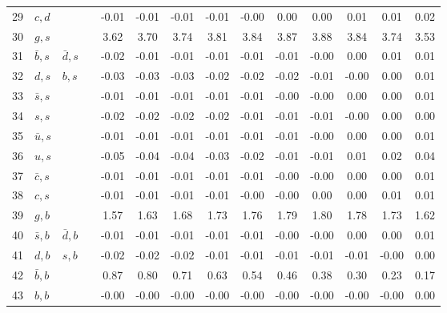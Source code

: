 \begin{tabularx}{\textwidth}{rXXX@{}S@{}S@{}S@{}S@{}S@{}S@{}S@{}S@{}S@{}S}
 29 & $c, d$           &                   &                  & -0.01 & -0.01 & -0.01 & -0.01 & -0.00 &  0.00 &  0.00 &  0.01 &  0.01 &  0.02 \\
 30 & $g, s$           &                   &                  &  3.62 &  3.70 &  3.74 &  3.81 &  3.84 &  3.87 &  3.88 &  3.84 &  3.74 &  3.53 \\
 31 & $\bar b, s$      & $\bar d, s$       &                  & -0.02 & -0.01 & -0.01 & -0.01 & -0.01 & -0.01 & -0.00 &  0.00 &  0.01 &  0.01 \\
 32 & $d, s$           & $b, s$            &                  & -0.03 & -0.03 & -0.03 & -0.02 & -0.02 & -0.02 & -0.01 & -0.00 &  0.00 &  0.01 \\
 33 & $\bar s, s$      &                   &                  & -0.01 & -0.01 & -0.01 & -0.01 & -0.01 & -0.00 & -0.00 &  0.00 &  0.00 &  0.01 \\
 34 & $s, s$           &                   &                  & -0.02 & -0.02 & -0.02 & -0.02 & -0.01 & -0.01 & -0.01 & -0.00 &  0.00 &  0.00 \\
 35 & $\bar u, s$      &                   &                  & -0.01 & -0.01 & -0.01 & -0.01 & -0.01 & -0.01 & -0.00 &  0.00 &  0.00 &  0.01 \\
 36 & $u, s$           &                   &                  & -0.05 & -0.04 & -0.04 & -0.03 & -0.02 & -0.01 & -0.01 &  0.01 &  0.02 &  0.04 \\
 37 & $\bar c, s$      &                   &                  & -0.01 & -0.01 & -0.01 & -0.01 & -0.01 & -0.00 & -0.00 &  0.00 &  0.00 &  0.01 \\
 38 & $c, s$           &                   &                  & -0.01 & -0.01 & -0.01 & -0.01 & -0.00 & -0.00 &  0.00 &  0.00 &  0.01 &  0.01 \\
 39 & $g,  b$          &                   &                  &  1.57 &  1.63 &  1.68 &  1.73 &  1.76 &  1.79 &  1.80 &  1.78 &  1.73 &  1.62 \\
 40 & $\bar s, b$      & $\bar d, b$       &                  & -0.01 & -0.01 & -0.01 & -0.01 & -0.01 & -0.00 & -0.00 &  0.00 &  0.00 &  0.01 \\
 41 & $d, b$           & $s, b$            &                  & -0.02 & -0.02 & -0.02 & -0.01 & -0.01 & -0.01 & -0.01 & -0.01 & -0.00 &  0.00 \\
 42 & $\bar b, b$      &                   &                  &  0.87 &  0.80 &  0.71 &  0.63 &  0.54 &  0.46 &  0.38 &  0.30 &  0.23 &  0.17 \\
 43 & $b, b$           &                   &                  & -0.00 & -0.00 & -0.00 & -0.00 & -0.00 & -0.00 & -0.00 & -0.00 & -0.00 &  0.00 \\

\end{tabularx}

